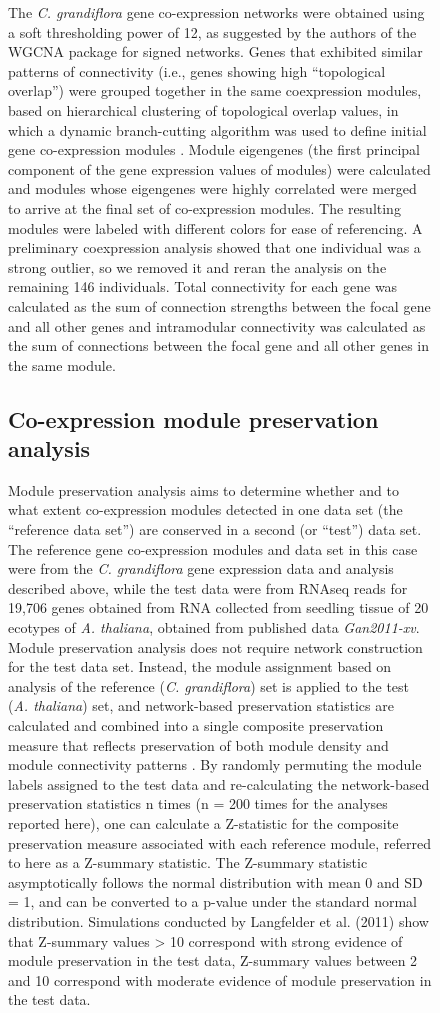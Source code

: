 \begin{figure}[ht!]
The \textit{C. grandiflora} gene co-expression networks were obtained using  a soft thresholding power of 12, as suggested by the authors of the WGCNA package for signed networks. Genes that exhibited similar patterns of connectivity (i.e., genes showing high “topological overlap”) were grouped together in the same coexpression modules, based on hierarchical clustering of topological overlap values, in which a dynamic branch-cutting algorithm was used to define initial gene co-expression modules \citep{langfelder2008}.  Module eigengenes (the first principal component of the gene expression values of modules) were calculated and modules whose eigengenes were highly correlated were merged to arrive at the final set of co-expression modules. The resulting modules were labeled with different colors for ease of referencing. A preliminary coexpression analysis showed that one individual was a strong outlier, so we removed it and reran the analysis on the remaining 146 individuals. Total connectivity for each gene was calculated as the sum of connection strengths between the focal gene and all other genes and intramodular connectivity was calculated as the sum of connections between the focal gene and all other genes in the same module. 

\subsection{Co-expression module preservation analysis}
Module preservation analysis aims to determine whether and to what extent co-expression modules detected in one data set (the “reference data set”) are conserved in a second (or “test”) data set. The reference gene co-expression modules and data set in this case were from the \textit{C. grandiflora} gene expression data and analysis described above, while the test data were from RNAseq reads for 19,706 genes obtained from RNA collected from seedling tissue of 20 ecotypes of \textit{A. thaliana}, obtained from published data \textit{Gan2011-xv}. Module preservation analysis does not require network construction for the test data set. Instead, the module assignment based on analysis of the reference (\textit{C. grandiflora}) set is applied to the test (\textit{A. thaliana}) set, and network-based preservation statistics are calculated and combined into a single composite preservation measure that reflects preservation of both module density and module connectivity patterns \citep{langfelder2011}. By randomly permuting the module labels assigned to the test data and re-calculating the network-based preservation statistics n times (n = 200 times for the analyses reported here), one can calculate a Z-statistic for the composite preservation measure associated with each reference module, referred to here as a Z-summary statistic.  The Z-summary statistic asymptotically follows the normal distribution with mean 0 and SD = 1, and can be converted to a p-value under the standard normal distribution.  Simulations conducted by Langfelder et al. (2011) show that Z-summary values > 10 correspond with strong evidence of module preservation in the test data, Z-summary values between 2 and 10 correspond with moderate evidence of module preservation in the test data.


\end{figure}
